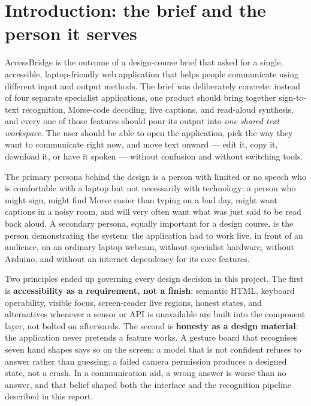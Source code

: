 \documentclass[11pt,a4paper]{article}
\begin{document}
\tableofcontents
\newpage

\section{Introduction: the brief and the person it serves}

AccessBridge is the outcome of a design-course brief that asked for a single, accessible, laptop-friendly web application that helps people communicate using different input and output methods. The brief was deliberately concrete: instead of four separate specialist applications, one product should bring together sign-to-text recognition, Morse-code decoding, live captions, and read-aloud synthesis, and every one of those features should pour its output into \emph{one shared text workspace}. The user should be able to open the application, pick the way they want to communicate right now, and move text onward --- edit it, copy it, download it, or have it spoken --- without confusion and without switching tools.

The primary persona behind the design is a person with limited or no speech who is comfortable with a laptop but not necessarily with technology: a person who might sign, might find Morse easier than typing on a bad day, might want captions in a noisy room, and will very often want what was just said to be read back aloud. A secondary persona, equally important for a design course, is the person demonstrating the system: the application had to work live, in front of an audience, on an ordinary laptop webcam, without specialist hardware, without Arduino, and without an internet dependency for its core features.

Two principles ended up governing every design decision in this project. The first is \textbf{accessibility as a requirement, not a finish}: semantic HTML, keyboard operability, visible focus, screen-reader live regions, honest states, and alternatives whenever a sensor or API is unavailable are built into the component layer, not bolted on afterwards. The second is \textbf{honesty as a design material}: the application never pretends a feature works. A gesture board that recognises seven hand shapes says so on the screen; a model that is not confident refuses to answer rather than guessing; a failed camera permission produces a designed state, not a crash. In a communication aid, a wrong answer is worse than no answer, and that belief shaped both the interface and the recognition pipeline described in this report.
\end{document}
